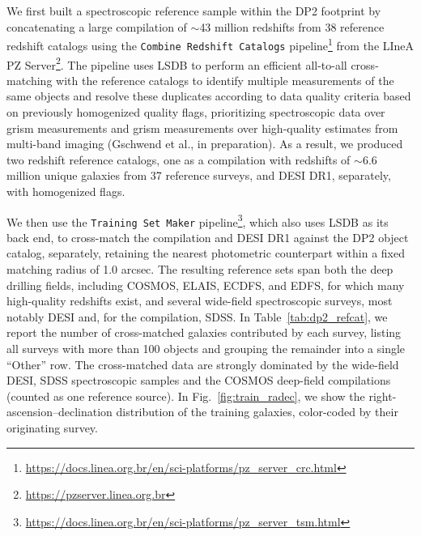 We first built a spectroscopic reference sample within the DP2 footprint by concatenating a large compilation of $\sim$43 million redshifts from 38 reference redshift catalogs using the \texttt{Combine Redshift Catalogs} pipeline\footnote{\url{https://docs.linea.org.br/en/sci-platforms/pz_server_crc.html}} from the LIneA PZ Server\footnote{\url{https://pzserver.linea.org.br}}. The pipeline uses \textsc{LSDB} to perform an efficient all-to-all cross-matching with the reference catalogs to identify multiple measurements of the same objects and resolve these duplicates according to data quality criteria based on previously homogenized quality flags, prioritizing spectroscopic data over grism measurements and grism measurements over high-quality \photoz estimates from multi-band imaging (Gschwend et al., in preparation). As a result, we produced two redshift reference catalogs, one as a compilation with redshifts of $\sim$6.6 million unique galaxies from 37 reference surveys, and DESI DR1, separately, with homogenized flags.     

We then use the \texttt{Training Set Maker} pipeline\footnote{\url{https://docs.linea.org.br/en/sci-platforms/pz_server_tsm.html}}, which also uses \textsc{LSDB} as its back end, to cross-match the compilation and DESI DR1 against the DP2 object catalog, separately, retaining the nearest photometric counterpart within a fixed matching radius of 1.0 arcsec. The resulting reference sets span both the deep drilling fields, including COSMOS, ELAIS, ECDFS, and EDFS, for which many high-quality redshifts exist, and several wide-field spectroscopic surveys, most notably DESI and, for the compilation, SDSS. In Table~\ref{tab:dp2_refcat}, we report the number of cross-matched galaxies contributed by each survey, listing all surveys with more than 100 objects and grouping the remainder into a single ``Other'' row.  The cross-matched data are strongly dominated by the wide-field DESI, SDSS spectroscopic samples and the COSMOS deep-field compilations (counted as one reference source). In Fig.~\ref{fig:train_radec}, we show the right-ascension--declination distribution of the training galaxies, color-coded by their originating survey.

